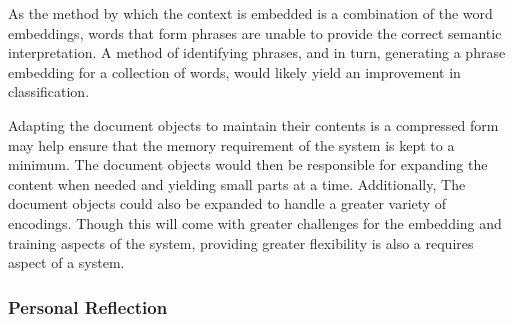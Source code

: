 \documentclass[11pt]{article} %
\begin{document}
As the method by which the context is embedded is a combination of the word embeddings, words that form phrases are unable to provide the correct semantic interpretation. A method of identifying phrases, and in turn, generating a phrase embedding for a collection of words, would likely yield an improvement in classification.

Adapting the document objects to maintain their contents is a compressed form may help ensure that the memory requirement of the system is kept to a minimum. The document objects would then be responsible for expanding the content when needed and yielding small parts at a time. Additionally, The document objects could also be expanded to handle a greater variety of encodings. Though this will come with greater challenges for the embedding and training aspects of the system, providing greater flexibility is also a requires aspect of a system.

\subsubsection{Personal Reflection}


\end{document}
